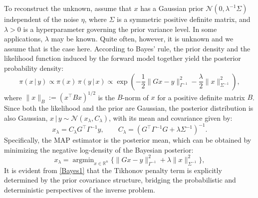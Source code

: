 \documentclass[]{myarticle}
\newcommand\argmin{\mathop{\mathrm{argmin}}}
\begin{document}
To reconstruct the unknown, assume that $x$ has a Gaussian prior $\mathcal{N}(0,\lambda^{-1}\Sigma)$ independent of the noise $\eta$, where $\Sigma$ is a symmetric positive definite matrix, and $\lambda>0$ is a hyperparameter governing the prior variance level. In some applications, $\lambda$ may be known. Quite often, however, it is unknown and we assume that is the case here. According to Bayes' rule, the prior density and the likelihood function induced by the forward model  together yield the posterior probability density:
\begin{equation}
	\pi(x\,|\,y) \propto \pi(x)\,\pi(y\,|\,x)
	\propto \exp\left(-\frac{1}{2}\|Gx-y\|_{\Gamma^{-1}}^{2}-\frac{\lambda}{2}\|x\|_{\Sigma^{-1}}^2\right),
\end{equation}
where  $\|x\|_{B}:=(x^{\top}Bx)^{1/2}$ is the $B$-norm of $x$ for a positive definite matrix $B$. Since both the likelihood and the prior are Gaussian, the posterior distribution is also Gaussian, $x\,|\,y \sim \mathcal{N}(x_\lambda, C_\lambda)$, with its mean and covariance given by:
\begin{equation}\label{post_distr}
  x_{\lambda} = C_{\lambda}G^{\top}\Gamma^{-1}y, \qquad
  C_{\lambda} = (G^{\top}\Gamma^{-1}G+\lambda\Sigma^{-1})^{-1}.
\end{equation}
Specifically, the MAP estimator is the posterior mean, which can be obtained by minimizing the negative log-density of the Bayesian posterior:
\begin{equation}\label{Bayes1}
	x_{\lambda} = \argmin_{x \in \mathbb{R}^{n}}\{\|Gx-y\|_{\Gamma^{-1}}^{2} + \lambda\|x\|_{\Sigma^{-1}}^2\},
\end{equation}
It is evident from \cref{Bayes1} that the Tikhonov penalty term is explicitly determined by the prior covariance structure, bridging the probabilistic and deterministic perspectives of the inverse problem.
\end{document}
